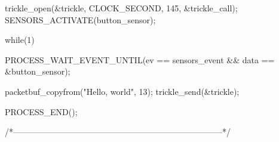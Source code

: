 \begin{DoxyCodeInclude}
{  trickle_open(&trickle, CLOCK_SECOND, 145, &trickle_call);
  SENSORS_ACTIVATE(button_sensor);

  while(1) {
    PROCESS_WAIT_EVENT_UNTIL(ev == sensors_event &&
                             data == &button_sensor);

    packetbuf_copyfrom("Hello, world", 13);
    trickle_send(&trickle);

  }
  PROCESS_END();
}
/*---------------------------------------------------------------------------*/
\end{DoxyCodeInclude}
 